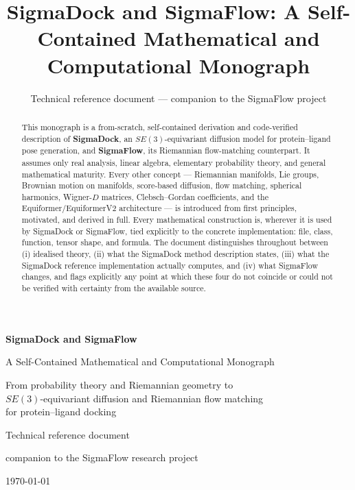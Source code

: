 \documentclass[11pt,a4paper]{report}
\title{SigmaDock and SigmaFlow: A Self-Contained Mathematical and
Computational Monograph}
\author{Technical reference document --- companion to the SigmaFlow project}
\date{}
\theoremstyle{definition}
\theoremstyle{remark}
\begin{document}
\begin{titlepage}
\centering
\vspace*{2cm}
{\Huge\bfseries SigmaDock and SigmaFlow\par}
\vspace{0.8cm}
{\Large A Self-Contained Mathematical and Computational Monograph\par}
\vspace{0.4cm}
{\large From probability theory and Riemannian geometry to \\
$SE(3)$-equivariant diffusion and Riemannian flow matching \\
for protein--ligand docking\par}
\vspace{2.5cm}
{\large Technical reference document\par}
\vspace{0.3cm}
{\large companion to the SigmaFlow research project\par}
\vfill
{\large \today\par}
\end{titlepage}

\clearpage
\begin{abstract}
\noindent
This monograph is a from-scratch, self-contained derivation and code-verified
description of \textbf{SigmaDock}, an $SE(3)$-equivariant diffusion model for
protein--ligand pose generation, and \textbf{SigmaFlow}, its Riemannian
flow-matching counterpart. It assumes only real analysis, linear algebra,
elementary probability theory, and general mathematical maturity. Every other
concept --- Riemannian manifolds, Lie groups, Brownian motion on manifolds,
score-based diffusion, flow matching, spherical harmonics, Wigner-$D$
matrices, Clebsch--Gordan coefficients, and the Equiformer/EquiformerV2
architecture --- is introduced from first principles, motivated, and derived
in full. Every mathematical construction is, wherever it is used by
SigmaDock or SigmaFlow, tied explicitly to the concrete implementation: file,
class, function, tensor shape, and formula. The document distinguishes
throughout between (i) idealised theory, (ii) what the SigmaDock method
description states, (iii) what the SigmaDock reference implementation
actually computes, and (iv) what SigmaFlow changes, and flags explicitly any
point at which these four do not coincide or could not be verified with
certainty from the available source.
\end{abstract}
\end{document}
